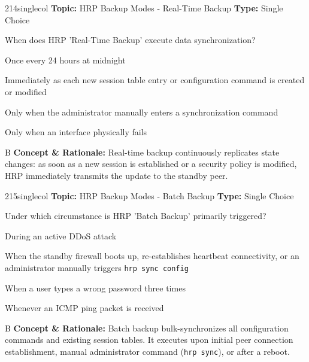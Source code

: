\begin{qcard}{214}{singlecol}
\textcolor{darkslate!75}{\small\textbf{Topic:} HRP Backup Modes - Real-Time Backup \hfill \textbf{Type:} Single Choice}\vspace{0.4em}\par
When does HRP 'Real-Time Backup' execute data synchronization?
\begin{qoptions}
\item Once every 24 hours at midnight
\item Immediately as each new session table entry or configuration command is created or modified
\item Only when the administrator manually enters a synchronization command
\item Only when an interface physically fails
\end{qoptions}
\end{qcard}
\nopagebreak
\begin{explainbox}{B}
\textbf{Concept \& Rationale:} Real-time backup continuously replicates state changes: as soon as a new session is established or a security policy is modified, HRP immediately transmits the update to the standby peer.
\end{explainbox}

\begin{qcard}{215}{singlecol}
\textcolor{darkslate!75}{\small\textbf{Topic:} HRP Backup Modes - Batch Backup \hfill \textbf{Type:} Single Choice}\vspace{0.4em}\par
Under which circumstance is HRP 'Batch Backup' primarily triggered?
\begin{qoptions}
\item During an active DDoS attack
\item When the standby firewall boots up, re-establishes heartbeat connectivity, or an administrator manually triggers \texttt{hrp sync config}
\item When a user types a wrong password three times
\item Whenever an ICMP ping packet is received
\end{qoptions}
\end{qcard}
\nopagebreak
\begin{explainbox}{B}
\textbf{Concept \& Rationale:} Batch backup bulk-synchronizes all configuration commands and existing session tables. It executes upon initial peer connection establishment, manual administrator command (\texttt{hrp sync}), or after a reboot.
\end{explainbox}


